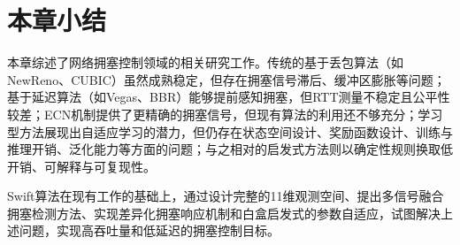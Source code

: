 \section{本章小结}

本章综述了网络拥塞控制领域的相关研究工作。传统的基于丢包算法（如NewReno、CUBIC）虽然成熟稳定，但存在拥塞信号滞后、缓冲区膨胀等问题；基于延迟算法（如Vegas、BBR）能够提前感知拥塞，但RTT测量不稳定且公平性较差；ECN机制提供了更精确的拥塞信号，但现有算法的利用还不够充分；学习型方法展现出自适应学习的潜力，但仍存在状态空间设计、奖励函数设计、训练与推理开销、泛化能力等方面的问题；与之相对的启发式方法则以确定性规则换取低开销、可解释与可复现性。

Swift算法在现有工作的基础上，通过设计完整的11维观测空间、提出多信号融合拥塞检测方法、实现差异化拥塞响应机制和白盒启发式的参数自适应，试图解决上述问题，实现高吞吐量和低延迟的拥塞控制目标。

